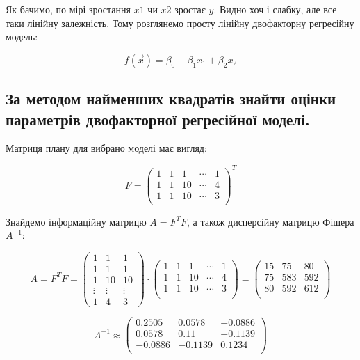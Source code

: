 \documentclass[a5paper, 20pt]{article}
\begin{document}
Як бачимо, по мірі зростання $x1$ чи $x2$ зростає $y$. Видно хоч і слабку, але все таки лінійну залежність. Тому розглянемо просту лінійну двофакторну регресійну модель:

$$ f(\vec{x})= \beta_0 + \beta_1 x_1 + \beta_2 x_2 $$

\subsection{За методом найменших квадратів знайти оцінки параметрів двофакторної регресійної моделі.}

Матриця плану для вибрано моделі має вигляд:

$$
F =
\begin{pmatrix}
1 & 1 & 1 & \cdots & 1 \\
1 & 1 & 10 & \cdots & 4 \\
1 & 1 &  10 & \cdots & 3 \\
\end{pmatrix}^T
$$

Знайдемо інформаційну матрицю $A = F^T F$, а також  дисперсійну матрицю Фішера $A^{-1}$:

$$
A =  F^T F =
\begin{pmatrix}
1 & 1 & 1 \\
1 & 1 & 1 \\
1 & 10 & 10 \\
\vdots & \vdots & \vdots \\
1 & 4 & 3 
\end{pmatrix}
\cdot
\begin{pmatrix}
1 & 1 & 1 & \cdots & 1 \\
1 & 1 & 10 & \cdots & 4 \\
1 & 1 &  10 & \cdots & 3 \\
\end{pmatrix}
=
\begin{pmatrix}
15 &  75 &  80 \\
75 & 583 & 592 \\
80 & 592 & 612 \\
\end{pmatrix}
$$


$$
A^{-1} \approx
\begin{pmatrix}
0.2505 &  0.0578 & -0.0886 \\
0.0578 &   0.11  & -0.1139 \\
-0.0886 & -0.1139 &  0.1234\\  
\end{pmatrix}
$$

\newpage{}
\end{document}
